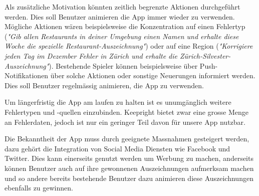 Als zusätzliche Motivation könnten zeitlich begrenzte Aktionen durchgeführt werden.
Dies soll Benutzer animieren die App immer wieder zu verwenden. 
Mögliche Aktionen wären beispielsweise die Konzentration auf einen Fehlertyp (\emph{"Gib allen Restaurants in deiner Umgebung einen Namen und erhalte diese Woche die spezielle Restaurant-Auszeichnung"}) oder auf eine Region (\emph{"Korrigiere jeden Tag im Dezember Fehler in Zürich und erhalte die Zürich-Silvester-Auszeichnung"}).
Bestehende Spieler können beispielsweise über Push-Notifikationen über solche Aktionen oder sonstige Neuerungen informiert werden.
Dies soll Benutzer regelmässig animieren, die App zu verwenden.

Um längerfristig die App am laufen zu halten ist es unumgänglich weitere Fehlertypen und -quellen einzubinden. 
Keepright bietet zwar eine grosse Menge an Fehlerdaten, jedoch ist nur ein geringer Teil davon für unsere App nutzbar.

Die Bekanntheit der App muss durch geeignete Massnahmen gesteigert werden, dazu gehört die Integration von Social Media Diensten wie Facebook und Twitter.
Dies kann einerseits genutzt werden um Werbung zu machen, anderseits können Benutzer auch auf ihre gewonnenen Auszeichnungen aufmerksam machen und so andere bereits bestehende Benutzer dazu animieren diese Auszeichnungen ebenfalls zu gewinnen.